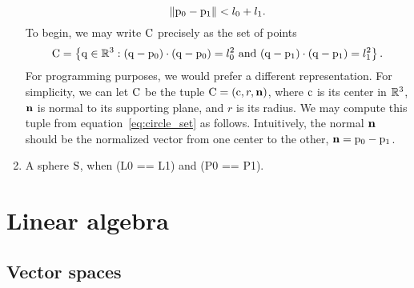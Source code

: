 \documentclass[oneside]{memoir}
\begin{document}
\begin{enumerate}
  \begin{equation}
  \|\mathrm{p_0}-\mathrm{p_1}\|<l_0+l_1. 
  \end{equation}
  To begin, we may write $\mathrm{C}$ precisely as the set of points 
  \begin{equation}\label{eq:circle_set}
  \mathrm{C} = \left\{\mathrm{q} \in \mathbb{R}^{3} : (\mathrm{q} - \mathrm{p_0})\cdot(\mathrm{q} -
  \mathrm{p_0})= l_0^2\text{ and } (\mathrm{q} - \mathrm{p_1})\cdot(\mathrm{q} -
  \mathrm{p_1})= l_1^2\right\}.
  \end{equation}
  For programming purposes, we would prefer a different representation. For
  simplicity, we can let $\mathrm{C}$ be the tuple $\mathrm{C} = (\mathrm{c},
  r, \mathbf{n})$, where $\mathrm{c}$ is its center in $\mathbb{R}^{3}$, $\mathbf{n}$ is normal
  to its supporting plane, and $r$ is its radius. We may compute this tuple from
  equation~\eqref{eq:circle_set} as follows. Intuitively, the normal $\mathbf{n}$
  should be the normalized vector from one center to the other, $\mathbf{n} =
  \mathrm{p_0}-\mathrm{p_1}$. 
  
  \item A sphere $\mathrm{S}$, when (L0 == L1) and (P0 == P1).
\end{enumerate}


\backmatter

\appendix
\chapter{Linear algebra}
 
\section{Vector spaces}
\end{document}
